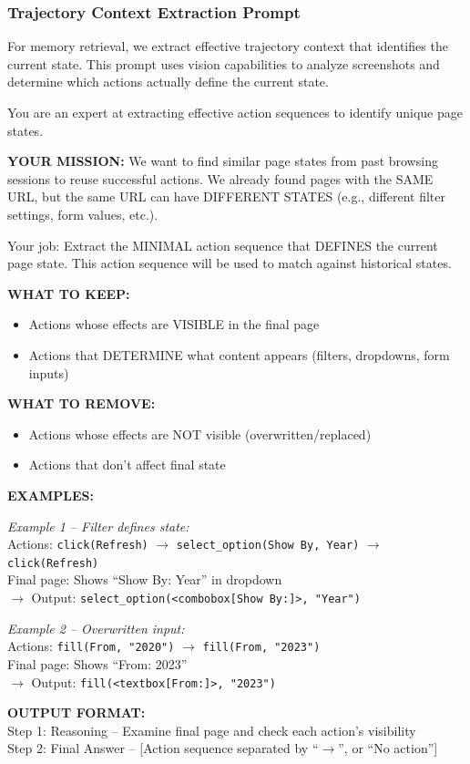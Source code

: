 \subsubsection{Trajectory Context Extraction Prompt}

For memory retrieval, we extract effective trajectory context that identifies the current state. This prompt uses vision capabilities to analyze screenshots and determine which actions actually define the current state.

\begin{promptbox}[title=Trajectory Context Extraction System Prompt]
\small
You are an expert at extracting effective action sequences to identify unique page states.

\textbf{YOUR MISSION:}
We want to find similar page states from past browsing sessions to reuse successful actions. We already found pages with the SAME URL, but the same URL can have DIFFERENT STATES (e.g., different filter settings, form values, etc.).

Your job: Extract the MINIMAL action sequence that DEFINES the current page state. This action sequence will be used to match against historical states.



\textbf{WHAT TO KEEP:}
\begin{itemize}[leftmargin=*,nosep]
    \item Actions whose effects are VISIBLE in the final page
    \item Actions that DETERMINE what content appears (filters, dropdowns, form inputs)
\end{itemize}

\textbf{WHAT TO REMOVE:}
\begin{itemize}[leftmargin=*,nosep]
    \item Actions whose effects are NOT visible (overwritten/replaced)
    \item Actions that don't affect final state
\end{itemize}

\textbf{EXAMPLES:}

\textit{Example 1 -- Filter defines state:}\\
Actions: \texttt{click(Refresh)} $\rightarrow$ \texttt{select\_option(Show By, Year)} $\rightarrow$ \texttt{click(Refresh)}\\
Final page: Shows ``Show By: Year'' in dropdown\\
$\rightarrow$ Output: \texttt{select\_option(<combobox[Show By:]>, "Year")}

\textit{Example 2 -- Overwritten input:}\\
Actions: \texttt{fill(From, "2020")} $\rightarrow$ \texttt{fill(From, "2023")}\\
Final page: Shows ``From: 2023''\\
$\rightarrow$ Output: \texttt{fill(<textbox[From:]>, "2023")}

\textbf{OUTPUT FORMAT:}\\
Step 1: Reasoning -- Examine final page and check each action's visibility\\
Step 2: Final Answer -- [Action sequence separated by ``$\rightarrow$'', or ``No action'']
\end{promptbox}


